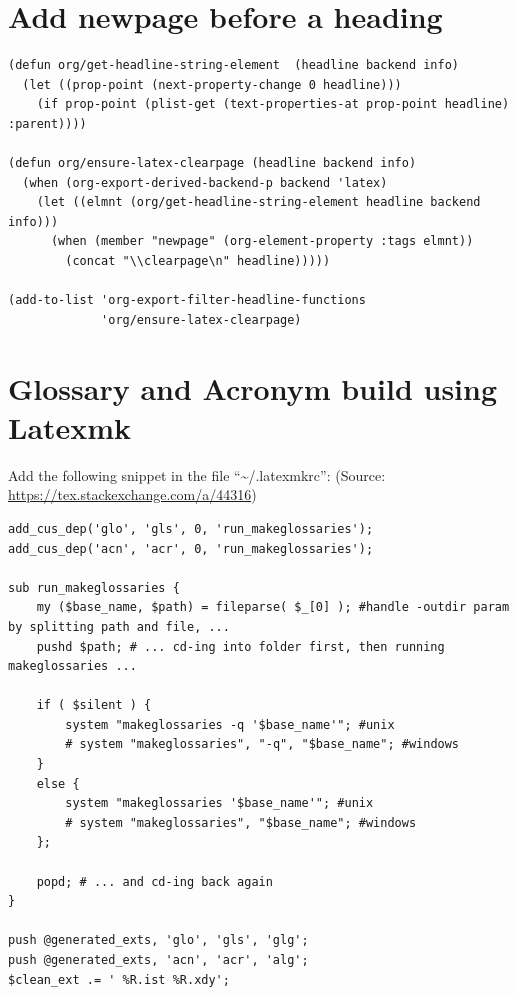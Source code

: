 \documentclass[letterpaper, 12pt]{report}
\begin{document}
\section{Add newpage before a heading}
\label{sec:org122b99a}

\begin{verbatim}
(defun org/get-headline-string-element  (headline backend info)
  (let ((prop-point (next-property-change 0 headline)))
    (if prop-point (plist-get (text-properties-at prop-point headline) :parent))))

(defun org/ensure-latex-clearpage (headline backend info)
  (when (org-export-derived-backend-p backend 'latex)
    (let ((elmnt (org/get-headline-string-element headline backend info)))
      (when (member "newpage" (org-element-property :tags elmnt))
        (concat "\\clearpage\n" headline)))))

(add-to-list 'org-export-filter-headline-functions
             'org/ensure-latex-clearpage)

\end{verbatim}

\section{Glossary and Acronym build using Latexmk}
\label{sec:org94133e2}

Add the following snippet in the file ``\textasciitilde{}/.latexmkrc'': (Source: \url{https://tex.stackexchange.com/a/44316})

\begin{verbatim}
add_cus_dep('glo', 'gls', 0, 'run_makeglossaries');
add_cus_dep('acn', 'acr', 0, 'run_makeglossaries');

sub run_makeglossaries {
    my ($base_name, $path) = fileparse( $_[0] ); #handle -outdir param by splitting path and file, ...
    pushd $path; # ... cd-ing into folder first, then running makeglossaries ...

    if ( $silent ) {
        system "makeglossaries -q '$base_name'"; #unix
        # system "makeglossaries", "-q", "$base_name"; #windows
    }
    else {
        system "makeglossaries '$base_name'"; #unix
        # system "makeglossaries", "$base_name"; #windows
    };

    popd; # ... and cd-ing back again
}

push @generated_exts, 'glo', 'gls', 'glg';
push @generated_exts, 'acn', 'acr', 'alg';
$clean_ext .= ' %R.ist %R.xdy';
\end{verbatim}
\end{document}
